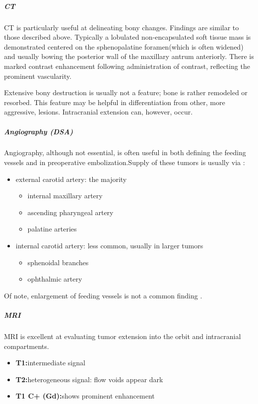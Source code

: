 \subparagraph{CT}

CT is particularly useful at delineating bony changes. Findings are similar to those described above. Typically a lobulated non-encapsulated soft tissue mass is demonstrated centered on the sphenopalatine foramen(which is often widened) and usually bowing the posterior wall of the maxillary antrum anteriorly. There is marked contrast enhancement following administration of contrast, reflecting the prominent vascularity.

Extensive bony destruction is usually not a feature; bone is rather remodeled or resorbed. This feature may be helpful in differentiation from other, more aggressive, lesions. Intracranial extension can, however, occur.

\subparagraph{Angiography (DSA)}

Angiography, although not essential, is often useful in both defining the feeding vessels and in preoperative embolization.Supply of these tumors is usually via :

\begin{itemize}
	\item
	external carotid artery: the majority
	
	\begin{itemize}
		\item
		internal maxillary artery
		\item
		ascending pharyngeal artery
		\item
		palatine arteries
	\end{itemize}
	\item
	internal carotid artery: less common, usually in larger tumors
	
	\begin{itemize}
		\item
		sphenoidal branches
		\item
		ophthalmic artery
	\end{itemize}
\end{itemize}

Of note, enlargement of feeding vessels is not a common finding .


\subparagraph{MRI}

MRI is excellent at evaluating tumor extension into the orbit and intracranial compartments.

\begin{itemize}
	\item
	\textbf{T1:}intermediate signal
	\item
	\textbf{T2:}heterogeneous signal: flow voids appear dark
	\item
	\textbf{T1 C+ (Gd):}shows prominent enhancement
\end{itemize}

